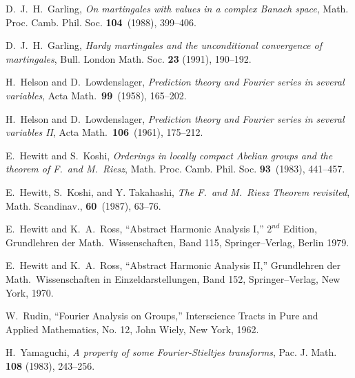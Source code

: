\documentclass[12pt,leqno]{article}
\begin{document}
\begin{thebibliography}{Dillo 83}
 D.\ J.\ H.\ Garling, 
{\em On martingales with values in a complex Banach space},
Math. Proc. Camb. Phil. Soc. {\bf 104}\ (1988), 399--406.


 D.\ J.\ H.\ Garling, 
{\em Hardy martingales and the unconditional convergence of martingales},
Bull. London Math. Soc. {\bf 23} (1991), 190--192.


  H.\ Helson and D.\ Lowdenslager,
{\em Prediction theory and Fourier series in several variables}, 
Acta Math.\ {\bf 99}\ (1958), 165--202.

  H.\ Helson and D.\ Lowdenslager,
{\em Prediction theory and Fourier series in several variables II}, 
Acta Math.\ {\bf 106}\ (1961), 175--212.

 E.\ Hewitt and S.\ Koshi, 
{\em Orderings in locally compact Abelian groups 
and the theorem of F.\ and M.\ Riesz}, 
Math. Proc. Camb. Phil. Soc.  {\bf 93}\ (1983), 441--457.

 E.\ Hewitt, S.\ Koshi, and Y. Takahashi, 
{\em The F.\ and M.\ Riesz Theorem revisited}, 
Math. Scandinav., {\bf 60}\ (1987), 63--76.

 E.\ Hewitt and K.\ A.\ Ross,
``Abstract Harmonic Analysis I,''  $2^{nd}$ Edition, Grundlehren der
Math.\ Wissenschaften, Band 115, Springer--Verlag, Berlin 1979.

 E.\ Hewitt and K.\ A.\ Ross,
``Abstract Harmonic Analysis II,'' Grundlehren der
Math.\ Wissenschaften in Einzeldarstellungen, Band
152, Springer--Verlag, New York, 1970.


 
 W.\ Rudin, 
``Fourier Analysis on Groups,''
Interscience Tracts in Pure and Applied Mathematics,
 No. 12, John Wiely, New York, 1962.
 
 H.\ Yamaguchi, 
{\em A property of some Fourier-Stieltjes transforms}, 
Pac. J. Math. {\bf 108} (1983), 243--256.

\end{thebibliography}
\end{document}
